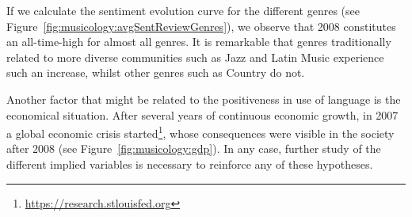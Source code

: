 If we calculate the sentiment evolution curve for the different genres (see Figure~\ref{fig:musicology:avgSentReviewGenres}), we observe that 2008 constitutes an all-time-high for almost all genres. It is remarkable that genres traditionally related to more diverse communities such as Jazz and Latin Music experience such an increase, whilst other genres such as Country do not.

Another factor that might be related to the positiveness in use of language is the economical situation. After several years of continuous economic growth, in 2007 a global economic crisis started\footnote{\url{https://research.stlouisfed.org}}, whose consequences were visible in the society after 2008 (see Figure~\ref{fig:musicology:gdp}). In any case, further study of the different implied variables is necessary to reinforce any of these hypotheses.




    



